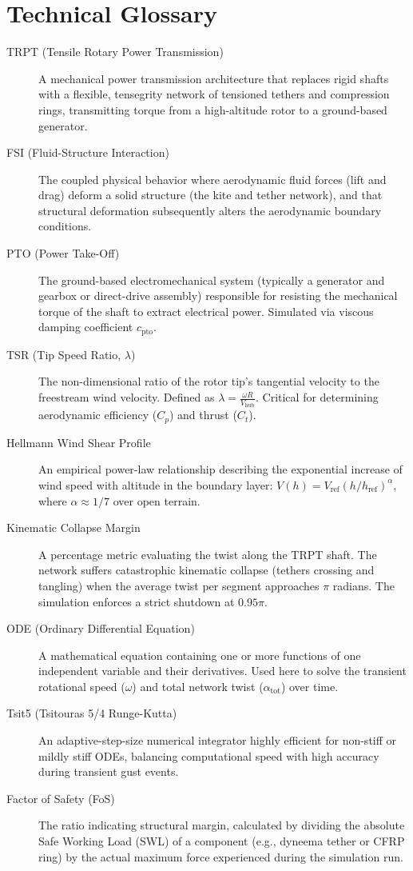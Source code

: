 \documentclass[11pt,a4paper]{article}
\begin{document}
\section{Technical Glossary}
\begin{description}
    \item[TRPT (Tensile Rotary Power Transmission)] A mechanical power transmission architecture that replaces rigid shafts with a flexible, tensegrity network of tensioned tethers and compression rings, transmitting torque from a high-altitude rotor to a ground-based generator.
    \item[FSI (Fluid-Structure Interaction)] The coupled physical behavior where aerodynamic fluid forces (lift and drag) deform a solid structure (the kite and tether network), and that structural deformation subsequently alters the aerodynamic boundary conditions.
    \item[PTO (Power Take-Off)] The ground-based electromechanical system (typically a generator and gearbox or direct-drive assembly) responsible for resisting the mechanical torque of the shaft to extract electrical power. Simulated via viscous damping coefficient $c_{\text{pto}}$.
    \item[TSR (Tip Speed Ratio, $\lambda$)] The non-dimensional ratio of the rotor tip's tangential velocity to the freestream wind velocity. Defined as $\lambda = \frac{\omega R}{V_{\text{hub}}}$. Critical for determining aerodynamic efficiency ($C_p$) and thrust ($C_t$).
    \item[Hellmann Wind Shear Profile] An empirical power-law relationship describing the exponential increase of wind speed with altitude in the boundary layer: $V(h) = V_{\text{ref}} (h/h_{\text{ref}})^\alpha$, where $\alpha \approx 1/7$ over open terrain.
    \item[Kinematic Collapse Margin] A percentage metric evaluating the twist along the TRPT shaft. The network suffers catastrophic kinematic collapse (tethers crossing and tangling) when the average twist per segment approaches $\pi$ radians. The simulation enforces a strict shutdown at $0.95\pi$.
    \item[ODE (Ordinary Differential Equation)] A mathematical equation containing one or more functions of one independent variable and their derivatives. Used here to solve the transient rotational speed ($\omega$) and total network twist ($\alpha_{\text{tot}}$) over time.
    \item[Tsit5 (Tsitouras 5/4 Runge-Kutta)] An adaptive-step-size numerical integrator highly efficient for non-stiff or mildly stiff ODEs, balancing computational speed with high accuracy during transient gust events.
    \item[Factor of Safety (FoS)] The ratio indicating structural margin, calculated by dividing the absolute Safe Working Load (SWL) of a component (e.g., dyneema tether or CFRP ring) by the actual maximum force experienced during the simulation run.
\end{description}
\end{document}
